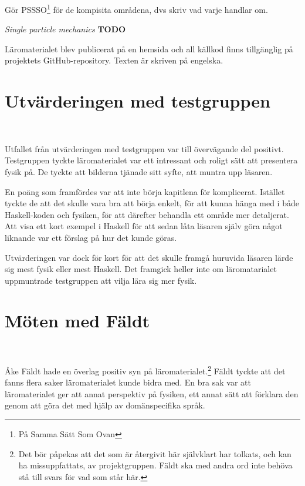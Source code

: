 \begin{draft}
Gör PSSSO\footnote{På Samma Sätt Som Ovan} för de kompisita områdena, dvs skriv
vad varje handlar om.

\textit{Single particle mechanics} \textbf{TODO}

Läromaterialet blev publicerat på en hemsida\cite{LYAP} och all källkod finns
tillgänglig på projektets GitHub-repository.\cite{LYAP_repo} Texten är skriven
på engelska.

%
%
%

\section{Utvärderingen med testgruppen}~\label{sec:res_test}

Utfallet från utvärderingen med testgruppen var till övervägande del positivt.
Testgruppen tyckte läromaterialet var ett intressant och roligt sätt att
presentera fysik på. De tyckte att bilderna tjänade sitt syfte, att muntra upp
läsaren. 

En poäng som framfördes var att inte börja kapitlena för komplicerat. Istället
tyckte de att det skulle vara bra att börja enkelt, för att kunna hänga med i
både Haskell-koden och fysiken, för att därefter behandla ett område mer
detaljerat. Att visa ett kort exempel i Haskell för att sedan låta läsaren själv
göra något liknande var ett förslag på hur det kunde göras.

Utvärderingen var dock för kort för att det skulle framgå huruvida läsaren lärde
sig mest fysik eller mest Haskell. Det framgick heller inte om läromatarialet
uppmuntrade testgruppen att vilja lära sig mer fysik.

\section{Möten med Fäldt}~\label{sec:res_ake}

Åke Fäldt hade en överlag positiv syn på läromaterialet.\footnote{Det bör
påpekas att det som är återgivit här självklart har tolkats, och kan ha
missuppfattats, av projektgruppen. Fäldt ska med andra ord inte behöva stå till
svars för vad som står här.} Fäldt tyckte att det fanns flera saker
läromaterialet kunde bidra med. En bra sak var att läromaterialet ger att annat
perspektiv på fysiken, ett annat sätt att förklara den genom att göra det med
hjälp av domänspecifika språk.


\end{draft}
